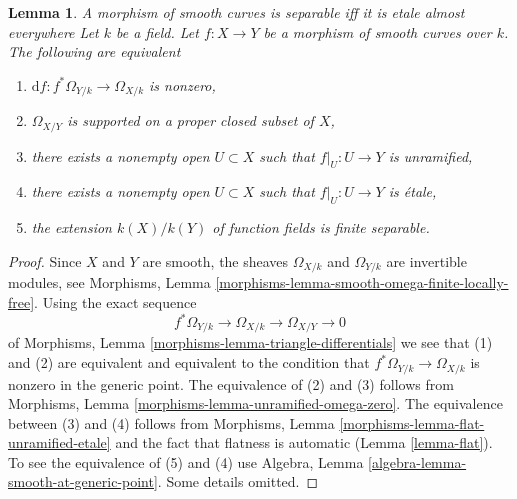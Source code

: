 \documentclass[10pt,a4paper]{amsart}
\newenvironment{slogan}{\comment}{\endcomment}
\theoremstyle{plain}
\newtheorem{lemma}[subsection]{Lemma}
\theoremstyle{definition}
\theoremstyle{remark}
\numberwithin{equation}{subsection}
\begin{document}
\begin{lemma}
\label{lemma-generically-etale}
\begin{slogan}
A morphism of smooth curves is separable iff it is etale almost everywhere
\end{slogan}
Let $k$ be a field. Let $f : X \to Y$ be a morphism of smooth curves over $k$.
The following are equivalent
\begin{enumerate}
\item $\text{d}f : f^*\Omega_{Y/k} \to \Omega_{X/k}$ is nonzero,
\item $\Omega_{X/Y}$ is supported on a proper closed subset of $X$,
\item there exists a nonempty open $U \subset X$ such that
$f|_U : U \to Y$ is unramified,
\item there exists a nonempty open $U \subset X$ such that
$f|_U : U \to Y$ is \'etale,
\item the extension $k(X)/k(Y)$ of function fields is
finite separable.
\end{enumerate}
\end{lemma}

\begin{proof}
Since $X$ and $Y$ are smooth, the sheaves $\Omega_{X/k}$ and
$\Omega_{Y/k}$ are invertible modules, see
Morphisms, Lemma \ref{morphisms-lemma-smooth-omega-finite-locally-free}.
Using the exact sequence
$$
f^*\Omega_{Y/k} \longrightarrow \Omega_{X/k}
\longrightarrow \Omega_{X/Y} \longrightarrow 0
$$
of Morphisms, Lemma \ref{morphisms-lemma-triangle-differentials}
we see that (1) and (2) are equivalent and equivalent to the
condition that $f^*\Omega_{Y/k} \to \Omega_{X/k}$ is nonzero
in the generic point. The equivalence of (2) and (3) follows
from Morphisms, Lemma \ref{morphisms-lemma-unramified-omega-zero}.
The equivalence between (3) and (4) follows from
Morphisms, Lemma \ref{morphisms-lemma-flat-unramified-etale}
and the fact that flatness is automatic
(Lemma \ref{lemma-flat}).
To see the equivalence of (5) and (4)
use Algebra, Lemma \ref{algebra-lemma-smooth-at-generic-point}.
Some details omitted.
\end{proof}
\end{document}
